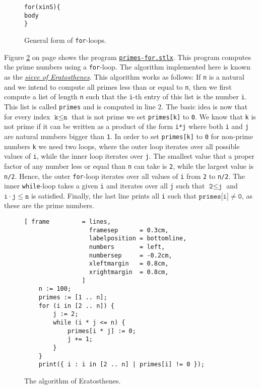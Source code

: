 \begin{figure}[!ht]
  \centering
\begin{alltt}
      for (x in S) \{
          body
      \}
\end{alltt}
\vspace*{-0.3cm}
\caption{General form of \texttt{for}-loops.}  \label{fig:for}
\end{figure} 

Figure  \ref{fig:primes-for.stlx} on page \pageref{fig:primes-for.stlx} shows the program
\href{https://github.com/karlstroetmann/Logik/blob/master/SetlX/primes-for.stlx}{\texttt{primes-for.stlx}}.
This program computes the prime numbers using a  \texttt{for}-loop.  The algorithm implemented here is known as
the \href{https://en.wikipedia.org/wiki/Sieve_of_Eratosthenes}{\emph{sieve of Eratosthenes}}.
This algorithm works as follows:  If \texttt{n} is a natural and we intend to compute all primes less than or
equal to \texttt{n}, then we first compute a list of length \texttt{n} such that the \texttt{i}-th entry of
this list is the number \texttt{i}.  This list is called \texttt{primes} and is computed in line 2.  The basic
idea is now that for every index $\texttt{k} \leq  \texttt{n}$ that is not prime we set \texttt{primes[k]} to
\texttt{0}.  We know that \texttt{k} is not prime if it can be written as a product of the form \texttt{i*j}
where both \texttt{i} and \texttt{j} are natural numbers bigger than \texttt{1}.
In order to set \texttt{primes[k]} to \texttt{0} for non-prime numbers \texttt{k} we need two loops,
where the outer loop iterates over all possible values of \texttt{i}, while the inner loop iterates
over \texttt{j}. The smallest value that a proper factor of any number less or equal than \texttt{n}
can take is \texttt{2}, while the largest value is \texttt{n/2}.  Hence,
the outer \texttt{for}-loop iterates over all values of \texttt{i} from \texttt{2} to \texttt{n/2}.
The inner \texttt{while}-loop takes a given \texttt{i} and iterates over all \texttt{j}
such that $\texttt{2} \leq \texttt{j}$ and $\texttt{i} \cdot \texttt{j} \leq \mathtt{n}$ is
satisfied.  Finally, the last line prints all \texttt{i} such that  $\texttt{primes[i]} \not= \mathtt{0}$, as these are
the prime numbers.


\begin{figure}[!ht]
  \centering
\begin{Verbatim}[ frame         = lines, 
                  framesep      = 0.3cm, 
                  labelposition = bottomline,
                  numbers       = left,
                  numbersep     = -0.2cm,
                  xleftmargin   = 0.8cm,
                  xrightmargin  = 0.8cm,
                ]
    n := 100;
    primes := [1 .. n];
    for (i in [2 .. n]) {
        j := 2;
        while (i * j <= n) {
            primes[i * j] := 0;
            j += 1;
        }
    }
    print({ i : i in [2 .. n] | primes[i] != 0 });
\end{Verbatim} 
\vspace*{-0.3cm}
\caption{The algorithm of Eratosthenes.}  \label{fig:primes-for.stlx}
\end{figure} 

